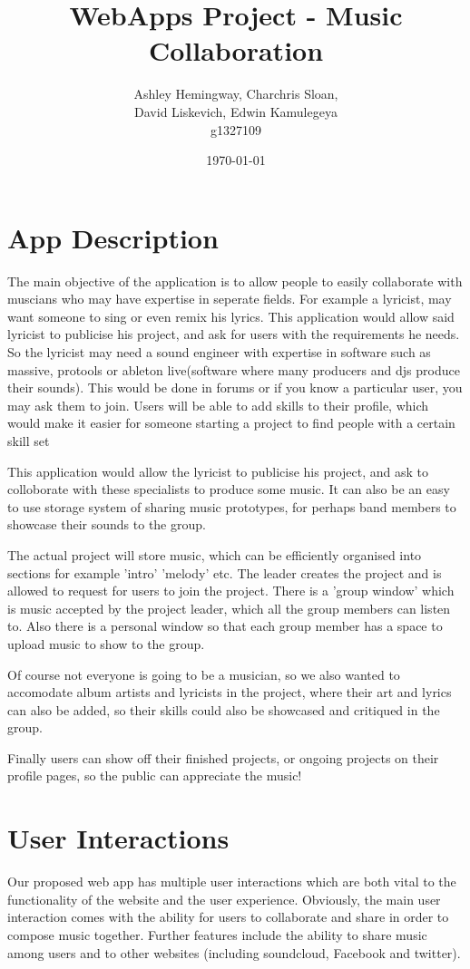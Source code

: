 \documentclass{article}
\title{WebApps Project - Music Collaboration}
\author{Ashley Hemingway, Charchris Sloan, \\ David Liskevich, Edwin Kamulegeya \\ g1327109}
\date{\today}
\begin{document}
\maketitle

\section{App Description}
The main objective of the application is to allow people to easily collaborate with muscians who may have expertise in seperate fields. For example a lyricist, may want someone to sing or even remix his lyrics. This application would allow said lyricist to publicise his project, and ask for users with the requirements he needs. So the lyricist may need a sound engineer with expertise in software such as massive, protools or ableton live(software where many producers and djs produce their sounds). This would be done in forums or if you know a particular user, you may ask them to join. Users will be able to add skills to their profile, which would make it easier for someone starting a project to find people with a certain skill set

This application would allow the lyricist to publicise his project, and ask to colloborate with these specialists to produce some music. It can also be an easy to use storage system of sharing music prototypes, for perhaps band members to showcase their sounds to the group.

The actual project will store music, which can be efficiently organised into sections for example 'intro' 'melody' etc. The leader creates the project and is allowed to request for users to join the project. There is a 'group window' which is music accepted by the project leader, which all the group members can listen to. Also there is a personal window so that each group member has a space to upload music to show to the group. 

Of course not everyone is going to be a musician, so we also wanted to accomodate album artists and lyricists in the project, where their art and lyrics can also be added, so their skills could also be showcased and critiqued in the group.

Finally users can show off their finished projects, or ongoing projects on their profile pages, so the public can appreciate the music!

\section{User Interactions}
Our proposed web app has multiple user interactions which are both vital to the functionality of the website and the user experience. Obviously, the main user interaction comes with the ability for users to collaborate and share in order to compose music together. Further features include the ability to share music among users and to other websites (including soundcloud, Facebook and twitter).
\end{document}
